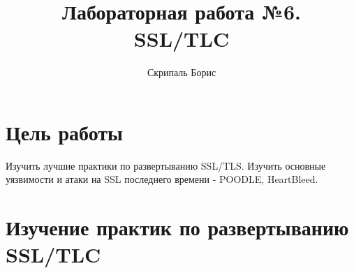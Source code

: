 \documentclass[10pt,a4paper]{report}
\author{Скрипаль Борис}
\title{Лабораторная работа №6.\\
	SSL/TLC}
\begin{document}
	\maketitle
	\renewcommand{\thesection}{\arabic{section}}
	\tableofcontents
	\pagebreak
	
	\setcounter{totalnumber}{10}
	\setcounter{topnumber}{10}
	\setcounter{bottomnumber}{10}
	\renewcommand{\topfraction}{1}
	\renewcommand{\textfraction}{0}
	
	\section{Цель работы}
		Изучить лучшие практики по развертыванию SSL/TLS.
		Изучить основные уязвимости и атаки на SSL последнего времени - POODLE, 
		HeartBleed.
	\section{Изучение практик по развертыванию SSL/TLC}
\end{document}
